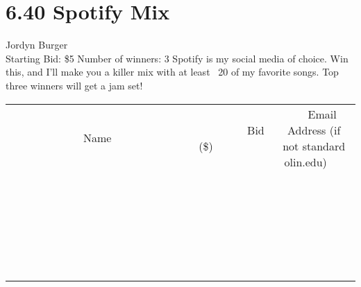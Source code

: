 \documentclass[11pt]{article}
\begin{document}
\section*{6.40 Spotify Mix}
Jordyn Burger
\\
Starting Bid: \$5
\newline
Number of winners: 3
\newline
Spotify is my social media of choice. Win this, and I'll make you a killer mix with at least ~20 of my favorite songs. Top three winners will get a jam set!
\\[6ex]
\begin{tabular}{c c c}
~~~~~~~~~~~~~Name~~~~~~~~~~~~~ & ~~~~~~~~~Bid (\$)~~~~~~~~~  & ~~~Email Address (if not standard olin.edu)~~~\\
 & & \\
\hline
 & & \\
\hline
 & & \\
\hline
 & & \\
\hline
 & & \\
\hline
 & & \\
\hline
 & & \\
\hline
 & & \\
\hline
 & & \\
\hline
 & & \\
\hline
 & & \\
\hline
 & & \\
\hline
 & & \\
\hline
 & & \\
\hline
 & & \\
\hline
 & & \\
\hline
 & & \\
\hline
 & & \\
\hline
 & & \\
\hline
 & & \\
\hline
 & & \\
\hline
 & & \\
\hline
 & & \\
\hline
 & & \\
\hline
 & & \\
\hline
 & & \\
\hline
\end{tabular}
\newpage
\end{document}
